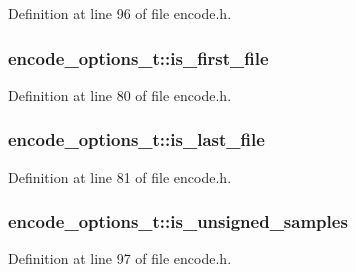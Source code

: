 Definition at line 96 of file encode.\+h.

\subsubsection[{\texorpdfstring{is\+\_\+first\+\_\+file}{is_first_file}}]{ encode\+\_\+options\+\_\+t\+::is\+\_\+first\+\_\+file}\hypertarget{structencode__options__t_a5eb06c070110743208687e0bbe86092d}{}\label{structencode__options__t_a5eb06c070110743208687e0bbe86092d}


Definition at line 80 of file encode.\+h.

\subsubsection[{\texorpdfstring{is\+\_\+last\+\_\+file}{is_last_file}}]{ encode\+\_\+options\+\_\+t\+::is\+\_\+last\+\_\+file}\hypertarget{structencode__options__t_a5055d03746345df9160d467716bbd592}{}\label{structencode__options__t_a5055d03746345df9160d467716bbd592}


Definition at line 81 of file encode.\+h.

\subsubsection[{\texorpdfstring{is\+\_\+unsigned\+\_\+samples}{is_unsigned_samples}}]{ encode\+\_\+options\+\_\+t\+::is\+\_\+unsigned\+\_\+samples}\hypertarget{structencode__options__t_a7825e8549fb2878602cdc8b20588e792}{}\label{structencode__options__t_a7825e8549fb2878602cdc8b20588e792}


Definition at line 97 of file encode.\+h.

